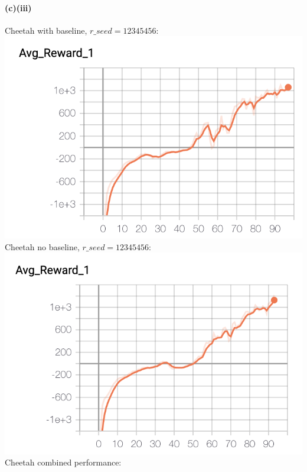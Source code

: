\documentclass[10pt,a4paper]{article}
\begin{document}
  \paragraph{(c)(iii)}    
  Cheetah with baseline, $r\_seed=12345456$: \\
  \includegraphics[scale=0.5]{images/cheetah_baseline_12345456_avg_reward.png} \\
  Cheetah no baseline, $r\_seed=12345456$: \\
  \includegraphics[scale=0.5]{images/cheetah_nobaseline_12345456_avg_reward.png} \\
  Cheetah combined performance: \\  
\end{document}
